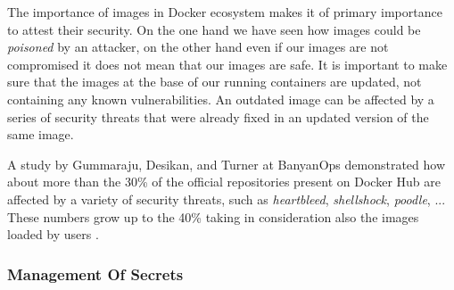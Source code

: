 \documentclass[a4paper,12pt]{article}
\begin{document}
The importance of images in Docker ecosystem makes it of primary importance to
attest their security. On the one hand we have seen how images could be
\textit{poisoned} by an attacker, on the other hand even if our images are not
compromised it does not mean that our images are safe. It is important to make
sure that the images at the base of our running containers are updated, not
containing any known vulnerabilities. An outdated image can be affected by a
series of security threats that were already fixed in an updated version of the
same image. \par A study by Gummaraju, Desikan, and Turner at BanyanOps
demonstrated how about more than the 30\% of the official repositories present
on Docker Hub are affected by a variety of security threats, such as
\textit{heartbleed}, \textit{shellshock}, \textit{poodle}, ... These numbers
grow up to the 40\% taking in consideration also the images loaded by users
\cite{gummaraju_desikan_turner}. 

\subsubsection{Management Of Secrets}
\end{document}
